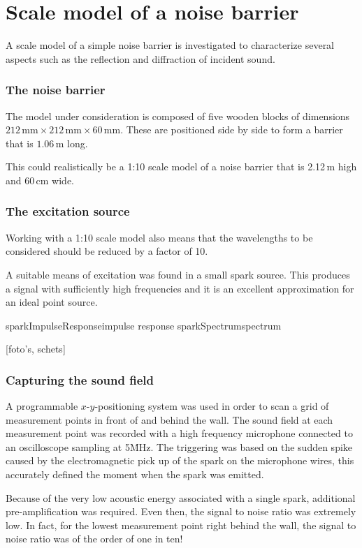 \section{Scale model of a noise barrier}
A scale model of a simple noise barrier is investigated to characterize several aspects such as the reflection and diffraction of incident sound.

\subsubsection*{The noise barrier}
The model under consideration is composed of five wooden blocks of dimensions $212\,\mathrm{mm} \times 212\,\mathrm{mm} \times 60\,\mathrm{mm}$. These are positioned side by side to form a barrier that is $1.06\,\mathrm{m}$ long.

This could realistically be a 1:10 scale model of a noise barrier that is 2.12\,m high and 60\,cm wide. 

\subsubsection*{The excitation source}
Working with a 1:10 scale model also means that the wavelengths to be considered should be reduced by a factor of 10.

A suitable means of excitation was found in a small spark source. This produces a signal with sufficiently high frequencies and it is an excellent approximation for an ideal point source.

	{sparkImpulseResponse}{impulse response}
	{sparkSpectrum}{spectrum}



[foto's, schets]

\subsubsection*{Capturing the sound field}
A programmable $x$-$y$-positioning system was used in order to scan a grid of measurement points in front of and behind the wall. The sound field at each measurement point was recorded with a high frequency microphone connected to an oscilloscope sampling at 5\.MHz. The triggering was based on the sudden spike caused by the electromagnetic pick up of the spark on the microphone wires, this accurately defined the moment when the spark was emitted.

Because of the very low acoustic energy associated with a single spark, additional pre-amplification was required. Even then, the signal to noise ratio was extremely low. In fact, for the lowest measurement point right behind the wall, the signal to noise ratio was of the order of one in ten!

